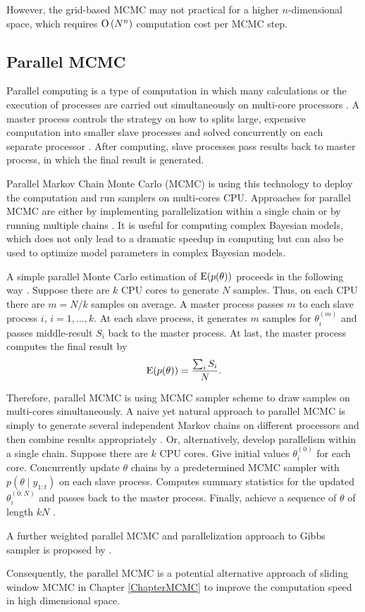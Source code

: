However, the grid-based MCMC may not practical for a higher $n$-dimensional space, which requires ${\rm O}\left(N^n\right)$ computation cost per MCMC step. 



\subsection*{Parallel MCMC}

Parallel computing is a type of computation in which many calculations or the execution of processes are carried out simultaneously on multi-core processors \cite{asanovic2006landscape}. A master process controls the strategy on how to splits large, expensive computation into smaller slave processes and solved concurrently on each separate processor \cite{Almasi1994Highly}. After computing, slave processes pass results back to master process, in which the final result is generated. 

Parallel Markov Chain Monte Carlo (MCMC) is using this technology to deploy the computation and run samplers on multi-cores CPU. Approaches for parallel MCMC are either by implementing parallelization within a single chain or by running multiple chains \cite{wu2012parallel}. It is useful for computing complex Bayesian models, which does not only lead to a dramatic speedup in computing but can also be used to optimize model parameters in complex Bayesian models.

A simple parallel Monte Carlo estimation of $\mathrm{E}(p(\theta))$ proceeds in the following way \cite{kontoghiorghes2005handbook}. Suppose there are $k$ CPU cores to generate $N$ samples. Thus, on each CPU there are $m=N/k$ samples on average. A master process passes $m$ to each slave process $i$, $i=1,\ldots,k$. At each slave process, it generates $m$ samples for $\theta_i^{(m)}$ and passes middle-result $S_i$ back to the master process. At last, the master process computes the final result by 
\begin{equation*}
\mathrm{E}(p(\theta))=\frac{\sum_i S_i}{N}. 
\end{equation*}

Therefore, parallel MCMC is using MCMC sampler scheme to draw samples on multi-cores simultaneously.  A naive yet natural approach to parallel MCMC is simply to generate several independent Markov chains on different
processors and then combine results appropriately \cite{bradford1996markov} \cite{gelman1992inference}. Or, alternatively, develop parallelism within a single chain. Suppose there are $k$ CPU cores. Give initial values $\theta_i^{(0)}$ for each core. Concurrently update $\theta$ chains by a predetermined MCMC sampler with $p(\theta\mid y_{1:t})$ on each slave process. Computes summary statistics for the updated $\theta_i^{(0:N)}$ and passes back to the master process. Finally, achieve a sequence of $\theta$ of length $kN$ \cite{wu2012parallel}. 

A further weighted parallel MCMC and parallelization approach to Gibbs sampler is proposed by \cite{vanderwerken2013parallel}.

Consequently, the parallel MCMC is a potential alternative approach of sliding window MCMC in Chapter \ref{ChapterMCMC} to improve the computation speed in high dimensional space. 


